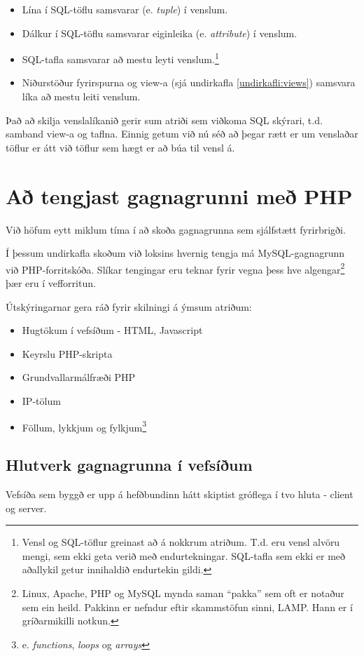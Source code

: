 \begin{itemize}
 \item Lína í SQL-töflu samsvarar (e. \emph{tuple}) í venslum.
 \item Dálkur í SQL-töflu samsvarar eiginleika (e. \emph{attribute}) í venslum.
 \item SQL-tafla samsvarar að mestu leyti venslum.\footnote{Vensl og SQL-töflur greinast að á nokkrum atriðum. T.d. eru vensl alvöru mengi, sem ekki geta verið með endurtekningar. SQL-tafla sem ekki er með aðallykil getur innihaldið endurtekin gildi.}
 \item Niðurstöður fyrirspurna og view-a (sjá undirkafla \ref{undirkafli:views}) samsvara líka að mestu leiti venslum.
\end{itemize}

Það að skilja venslalíkanið gerir sum atriði sem viðkoma SQL skýrari, t.d. samband view-a og taflna. Einnig getum við nú séð að þegar rætt er um venslaðar töflur er átt við töflur sem hægt er að búa til vensl á.


\section{Að tengjast gagnagrunni með PHP}
\label{undirkafli:php}
Við höfum eytt miklum tíma í að skoða gagnagrunna sem sjálfstætt fyrirbrigði.

Í þessum undirkafla skoðum við loksins hvernig tengja má MySQL-gagnagrunn við PHP-forritskóða.
Slíkar tengingar eru teknar fyrir vegna þess hve algengar\footnote{Linux, Apache, PHP og MySQL mynda saman ``pakka'' sem oft er notaður sem ein heild. Pakkinn er nefndur eftir skammstöfun sinni, LAMP. Hann er í gríðarmikilli notkun.} þær eru í vefforritun.

Útskýringarnar gera ráð fyrir skilningi á ýmsum atriðum:
\begin{itemize}
 \item Hugtökum í vefsíðum - HTML, Javascript
 \item Keyrslu PHP-skripta
 \item Grundvallarmálfræði PHP
 \item IP-tölum
 \item Föllum, lykkjum og fylkjum\footnote{e. \emph{functions}, \emph{loops} og \emph{arrays}}
\end{itemize}
\subsection{Hlutverk gagnagrunna í vefsíðum}
Vefsíða sem byggð er upp á hefðbundinn hátt skiptist gróflega í tvo hluta - client og server. 

